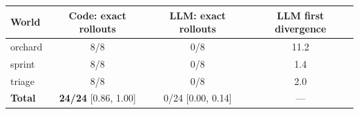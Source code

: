\begin{tabular}{lccc}
\toprule
World & Code: exact rollouts & LLM: exact rollouts & LLM first divergence \\
\midrule
orchard & 8/8 & 0/8 & 11.2 \\
sprint & 8/8 & 0/8 & 1.4 \\
triage & 8/8 & 0/8 & 2.0 \\
\midrule
\textbf{Total} & \textbf{24/24} [0.86, 1.00] & 0/24 [0.00, 0.14] & --- \\
\bottomrule
\end{tabular}
